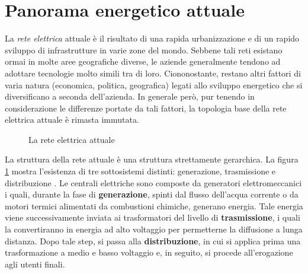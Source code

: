 \section{Panorama energetico attuale}
La \textit{rete elettrica} attuale è il risultato di una rapida urbanizzazione e di un rapido sviluppo di infrastrutture in varie zone del mondo. Sebbene tali reti esistano ormai in molte aree geografiche diverse, le aziende generalmente tendono ad adottare tecnologie molto simili tra di loro. Ciononostante, restano altri fattori  di varia natura (economica, politica, geografica) legati allo sviluppo energetico che si diversificano a seconda dell'azienda. \newline
In generale però, pur tenendo in considerazione le differenze portate da tali fattori, la topologia base della rete elettrica attuale è rimasta immutata.
\begin{figure}[h] 
\caption{La rete elettrica attuale}\label{fig:1}
\end{figure}
\newline La struttura della rete attuale è una struttura strettamente gerarchica. La figura \ref{fig:1} mostra l'esistenza di tre sottosistemi distinti: generazione, trasmissione e distribuzione \cite{pathsg}. \newline Le centrali elettriche sono composte da generatori elettromeccanici i quali, durante la fase di \textbf{generazione}, spinti dal flusso dell'acqua corrente o da motori termici alimentati da combustioni chimiche, generano energia. Tale energia viene successivamente inviata ai trasformatori del livello di \textbf{trasmissione}, i quali la convertiranno in energia ad alto voltaggio per permetterne la diffusione a lunga distanza. Dopo tale step, si passa alla \textbf{distribuzione}, in cui si applica prima una trasformazione a medio e basso voltaggio e, in seguito, si procede all'erogazione agli utenti finali.
